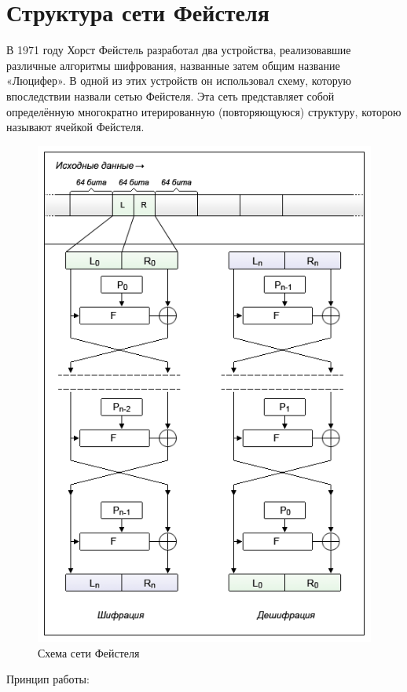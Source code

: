 \section{Структура сети Фейстеля}

В 1971 году Хорст Фейстель разработал два устройства, реализовавшие различные алгоритмы шифрования, названные затем общим название «Люцифер». В одной из этих устройств он использовал схему, которую впоследствии назвали сетью Фейстеля. Эта сеть представляет собой определённую многократно итерированную (повторяющуюся) структуру, которою называют ячейкой Фейстеля.

\begin{figure}[H]
	\centering
	\includegraphics[width=0.7\linewidth]{"../Лабораторные по Ринджиндайлу/img/feistel"}
	\caption{Схема сети Фейстеля}
\end{figure}

Принцип работы:

